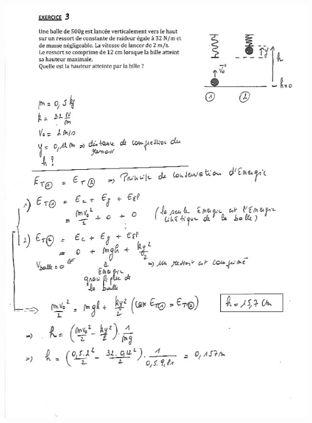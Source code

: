 \includegraphics[width=17.498cm,height=23.941cm]{Pictures/1000000100000264000003455C9DE3ADDE2F2C0A.png}

